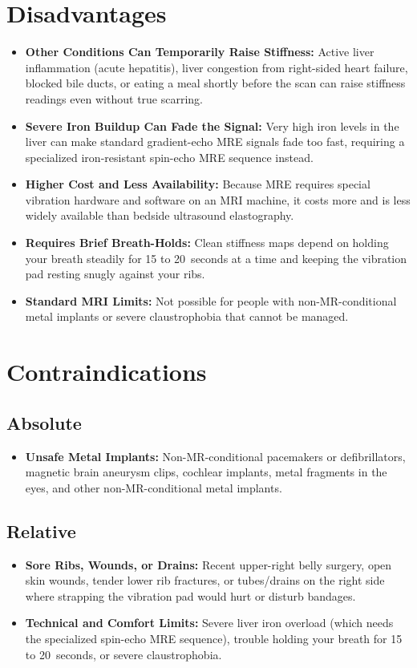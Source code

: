 \section{Disadvantages}
\begin{itemize}
\item \textbf{Other Conditions Can Temporarily Raise Stiffness:} Active liver inflammation (acute hepatitis), liver congestion from right-sided heart failure, blocked bile ducts, or eating a meal shortly before the scan can raise stiffness readings even without true scarring.
\item \textbf{Severe Iron Buildup Can Fade the Signal:} Very high iron levels in the liver can make standard gradient-echo MRE signals fade too fast, requiring a specialized iron-resistant spin-echo MRE sequence instead.
\item \textbf{Higher Cost and Less Availability:} Because MRE requires special vibration hardware and software on an MRI machine, it costs more and is less widely available than bedside ultrasound elastography.
\item \textbf{Requires Brief Breath-Holds:} Clean stiffness maps depend on holding your breath steadily for 15 to 20~seconds at a time and keeping the vibration pad resting snugly against your ribs.
\item \textbf{Standard MRI Limits:} Not possible for people with non-MR-conditional metal implants or severe claustrophobia that cannot be managed.
\end{itemize}

\section{Contraindications}

\subsection{Absolute}
\begin{itemize}
\item \textbf{Unsafe Metal Implants:} Non-MR-conditional pacemakers or defibrillators, magnetic brain aneurysm clips, cochlear implants, metal fragments in the eyes, and other non-MR-conditional metal implants.
\end{itemize}

\subsection{Relative}
\begin{itemize}
\item \textbf{Sore Ribs, Wounds, or Drains:} Recent upper-right belly surgery, open skin wounds, tender lower rib fractures, or tubes/drains on the right side where strapping the vibration pad would hurt or disturb bandages.
\item \textbf{Technical and Comfort Limits:} Severe liver iron overload (which needs the specialized spin-echo MRE sequence), trouble holding your breath for 15 to 20~seconds, or severe claustrophobia.
\end{itemize}

